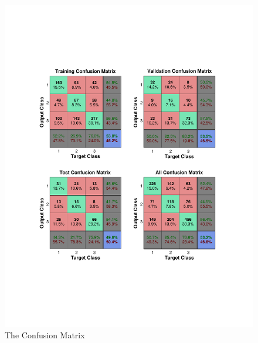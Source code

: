 \documentclass{sig-alternate}
\begin{document}
\begin{figure}[ht]
\centering
\includegraphics[scale = 0.5, trim = 300 150 300 150]{pic/cl1.pdf}
\caption{The Confusion Matrix}
\end{figure}
\end{document}
